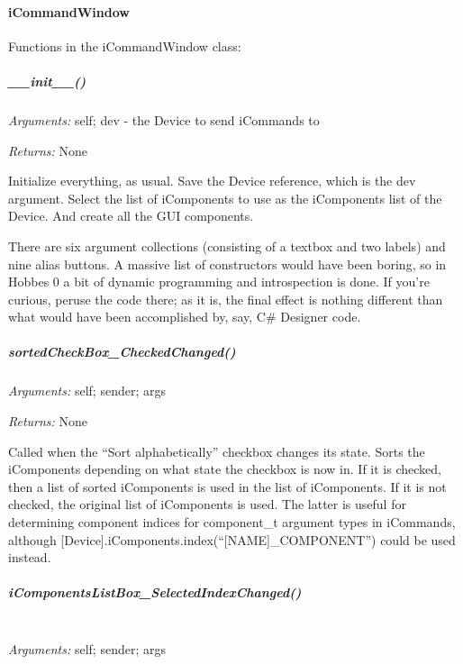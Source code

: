 \documentclass[12pt,letterpaper]{article}
\begin{document}
%
%
\paragraph{iCommandWindow}
\label{4.5.1.1}

Functions in the iCommandWindow class:

\setcounter{subparagraph}{-1}



%
%
\subparagraph{\_\_init\_\_()}
\label{4.5.1.1.0}

\emph{Arguments:} self; dev - the Device to send iCommands to

\emph{Returns:} None

Initialize everything, as usual. Save the Device reference, which is the dev argument. Select the list of iComponents to use as the iComponents list of the Device. And create all the GUI components.

There are six argument collections (consisting of a textbox and two labels) and nine alias buttons. A massive list of constructors would have been boring, so in Hobbes 0 a bit of dynamic programming and introspection is done. If you're curious, peruse the code there; as it is, the final effect is nothing different than what would have been accomplished by, say, C\# Designer code.



%
%
\subparagraph{sortedCheckBox\_CheckedChanged()}
\label{4.5.1.1.1}

\emph{Arguments:} self; sender; args

\emph{Returns:} None

Called when the ``Sort alphabetically'' checkbox changes its state. Sorts the iComponents depending on what state the checkbox is now in. If it is checked, then a list of sorted iComponents is used in the list of iComponents. If it is not checked, the original list of iComponents is used. The latter is useful for determining component indices for component\_t argument types in iCommands, although [Device].iComponents.index(``[NAME]\_COMPONENT'') could be used instead.



%
%
\subparagraph{iComponentsListBox\_SelectedIndexChanged()}
\label{4.5.1.1.2}

\textcolor{white}{dummy} \\ \emph{Arguments:} self; sender; args
\end{document}

